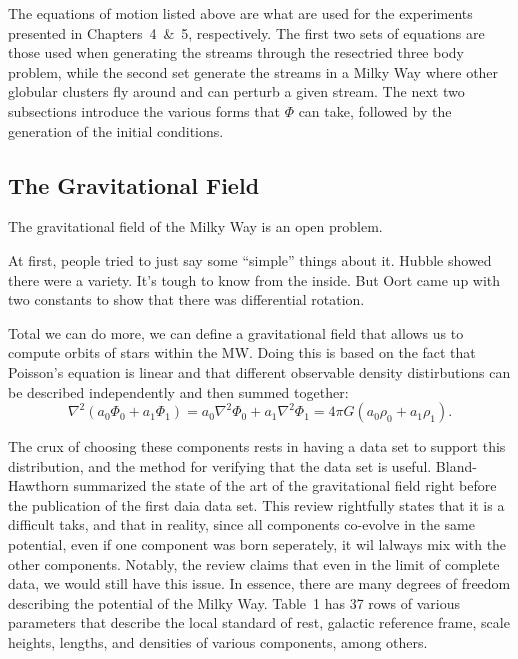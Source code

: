         The equations of motion listed above are what are used for the experiments presented in Chapters~4~\&~5, respectively. The first two sets of equations are those used when generating the streams through the resectried three body problem, while the second set generate the streams in a Milky Way where other globular clusters fly around and can perturb a given stream. The next two subsections introduce the various forms that $\Phi$ can take, followed by the generation of the initial conditions. 


    \subsection{The Gravitational Field} \label{subsec:gravfield}

        The gravitational field of the Milky Way is an open problem. 

        At first, people tried to just say some ``simple'' things about it. Hubble showed there were a variety. It's tough to know from the inside. But Oort came up with two constants to show that there was differential rotation. 

        Total we can do more, we can define a gravitational field that allows us to compute orbits of stars within the MW. Doing this is based on the fact that Poisson's equation is linear and that different observable density distirbutions can be described independently and then summed together: 
        \begin{equation}\label{eq:linear_poisson}
            \nabla^2 \left(a_0\Phi_0 + a_1\Phi_1 \right) = a_0 \nabla^2 \Phi_0 + a_1 \nabla^2 \Phi_1 = 4\pi G \left(a_0\rho_0 +a_1\rho_1\right).
        \end{equation}
        
        The crux of choosing these components rests in having a data set to support this distribution, and the method for verifying that the data set is useful. Bland-Hawthorn summarized the state of the art of the gravitational field right before the publication of the first daia data set. This review rightfully states that it is a difficult taks, and that in reality, since all components co-evolve in the same potential, even if one component was born seperately, it wil lalways mix with the other components. Notably, the review claims that even in the limit of complete data, we would still have this issue. In essence, there are many degrees of freedom describing the potential of the Milky Way. Table~1 has 37 rows of various parameters that describe the local standard of rest, galactic reference frame, scale heights, lengths, and densities of various components, among others. 

